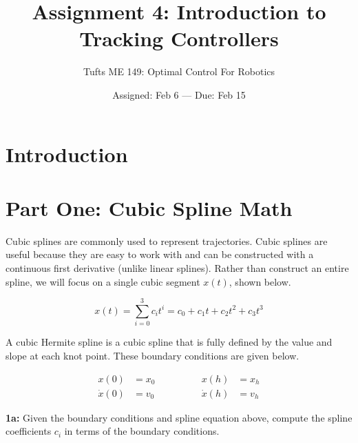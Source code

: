 

\title{Assignment 4:  Introduction to Tracking Controllers}
\date{Assigned:  Feb 6  ---  Due:  Feb 15}
\author{Tufts ME 149:  Optimal Control For Robotics}

\maketitle

\section*{Introduction}



\section*{Part One: Cubic Spline Math}

Cubic splines are commonly used to represent trajectories.
Cubic splines are useful because they are easy to work with and
can be constructed with a continuous first derivative (unlike linear splines).
Rather than construct an entire spline, we will focus on a single cubic segment $x(t)$, shown below.

\begin{equation}
x(t) = \sum_{i=0}^3 c_i t^i = c_0 + c_1 t + c_2 t^2 + c_3 t ^ 3
\end{equation}

A cubic Hermite spline is a cubic spline that is fully defined by the value and slope
at each knot point. These boundary conditions are given below.

\begin{align}
x(0) &= x_0
  \quad \quad & \quad \quad
x(h) &= x_h
  \\
\dot{x}(0) &= v_0
  \quad \quad & \quad \quad
\dot{x}(h) &= v_h
\end{align}

\textbf{1a:} Given the boundary conditions and spline equation above,
compute the spline coefficients $c_i$ in terms of the boundary conditions. \\

